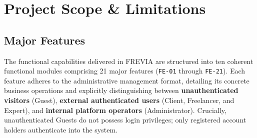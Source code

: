 \section{Project Scope \& Limitations}

\subsection{Major Features}

The functional capabilities delivered in FREVIA are structured into ten coherent functional modules comprising 21 major features (\texttt{FE-01} through \texttt{FE-21}). Each feature adheres to the administrative management format, detailing its concrete business operations and explicitly distinguishing between \textbf{unauthenticated visitors} (Guest), \textbf{external authenticated users} (Client, Freelancer, and Expert), and \textbf{internal platform operators} (Administrator). Crucially, unauthenticated Guests do not possess login privileges; only registered account holders authenticate into the system.

